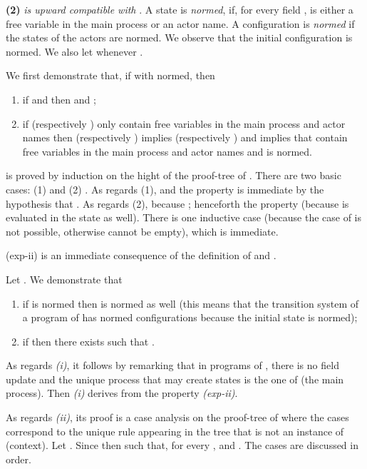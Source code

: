 \documentclass{LMCS}
\theoremstyle{plain}\newtheorem{proposition}[thm]{Proposition}
\theoremstyle{plain}\newtheorem{lemma}[thm]{Lemma}
\theoremstyle{plain}\newtheorem{theorem}[thm]{Theorem}
\theoremstyle{plain}\newtheorem{corollary}[thm]{Corollary}
\newcommand{\rulename}[1]{{\sc(#1)}}
\newcommand{\actroba}{}
\begin{document}
\medskip

{\bf (2)} \emph{ is upward compatible with }.
A state  is \emph{normed}, if, for every field ,  is 
either a free variable in the main process or an actor name.
A configuration is \emph{normed} if the states of the actors are normed.
We observe that the initial configuration is 
 normed.
We also let  whenever .

We first demonstrate that, if 
with  normed, then

\begin{enumerate}[label=(exp-\roman*)]
\item if   and  then
 and 
;

\item if  (respectively ) only contain  free variables in the main process 
and actor names
then  (respectively ) implies
 (respectively ) 
and  implies that  contain  free variables in the main process and actor names and  is normed.
\end{enumerate}

 is proved by induction on the hight of the proof-tree of 
. There are two basic cases:
(1)  and (2) . As regards (1),  and the property is
immediate by the hypothesis that . As regards (2),  because
; henceforth the property (because  is evaluated in the state 
 as well). There is one inductive case (because the case of 
is not possible, otherwise  cannot be empty), which is immediate.

{(exp-ii)} is an immediate consequence of the definition of  and
.

\bigskip

\noindent Let . We demonstrate that 

\begin{enumerate}[label=(\roman*)]
\item if  is normed then  is normed as well
(this means that the transition system  of a program
of {\actroba} has normed configurations because the initial state is normed);

\item if  then there exists  such that .
\end{enumerate}
As regards \emph{(i)}, it follows by remarking that in programs of {\actroba},
there is no field update and the unique process
that may create states is the one of  (the main process). Then 
\emph{(i)} derives from the property \emph{(exp-ii)}.

As regards \emph{(ii)}, its proof is a case analysis on the proof-tree of 
 where the cases correspond to the unique rule appearing
in the tree that is not an instance of \rulename{context}. 
Let . Since  then 
 such that, for every
, 
 and . 
The cases are discussed in order.
\end{document}
